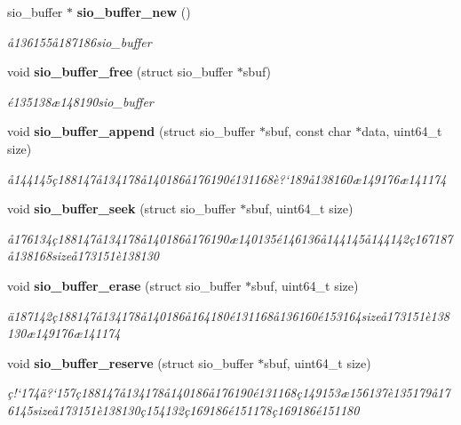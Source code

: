 \begin{CompactItemize}
\item 
sio\_\-buffer $\ast$ {\bf sio\_\-buffer\_\-new} ()
\begin{CompactList}\small\item\em \aa{}136155\aa{}187186sio\_\-buffer \item\end{CompactList}\item 
void {\bf sio\_\-buffer\_\-free} (struct sio\_\-buffer $\ast$sbuf)
\begin{CompactList}\small\item\em \'{e}135138\ae{}148190sio\_\-buffer \item\end{CompactList}\item 
void {\bf sio\_\-buffer\_\-append} (struct sio\_\-buffer $\ast$sbuf, const char $\ast$data, uint64\_\-t size)
\begin{CompactList}\small\item\em \aa{}144145\c{c}188147\aa{}134178\aa{}140186\aa{}176190\'{e}131168\`{e}?`189\aa{}138160\ae{}149176\ae{}141174 \item\end{CompactList}\item 
void {\bf sio\_\-buffer\_\-seek} (struct sio\_\-buffer $\ast$sbuf, uint64\_\-t size)
\begin{CompactList}\small\item\em \aa{}176134\c{c}188147\aa{}134178\aa{}140186\aa{}176190\ae{}140135\'{e}146136\aa{}144145\aa{}144142\c{c}167187\aa{}138168size\aa{}173151\`{e}138130 \item\end{CompactList}\item 
void {\bf sio\_\-buffer\_\-erase} (struct sio\_\-buffer $\ast$sbuf, uint64\_\-t size)
\begin{CompactList}\small\item\em \"{a}187142\c{c}188147\aa{}134178\aa{}140186\aa{}164180\'{e}131168\aa{}136160\'{e}153164size\aa{}173151\`{e}138130\ae{}149176\ae{}141174 \item\end{CompactList}\item 
void {\bf sio\_\-buffer\_\-reserve} (struct sio\_\-buffer $\ast$sbuf, uint64\_\-t size)
\begin{CompactList}\small\item\em \c{c}!`174\"{a}?`157\c{c}188147\aa{}134178\aa{}140186\aa{}176190\'{e}131168\c{c}149153\ae{}156137\`{e}135179\aa{}176145size\aa{}173151\`{e}138130\c{c}154132\c{c}169186\'{e}151178\c{c}169186\'{e}151180 \item\end{CompactList}\item 

\end{CompactItemize}
